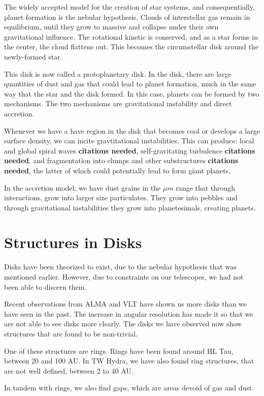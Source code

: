 \documentclass[onecolumn]{report}
\begin{document}
The widely accepted model for the creation of star systems, and consequentially, planet formation is the nebular hypothesis. Clouds of interstellar gas remain in equilibrium, until they grow to massive and collapse under their own gravitational influence. The rotational kinetic is conserved, and as a star forms in the center, the cloud flattens out. This becomes the circumstellar disk around the newly-formed star.


This disk is now called a protoplanetary disk. In the disk, there are large quantities of dust and gas that could lead to planet formation, much in the same way that the star and the disk formed. In this case, planets can be formed by two mechanisms. The two mechanisms are gravitational instability and direct accretion.

Whenever we have a have region in the disk that becomes cool or develops a large surface density, we can incite gravtitational instabilities. This can produce: local and global spiral waves \textbf{citations needed}, self-gravitating turbulence \textbf{citations needed}, and fragmentation into clumps and other substructures \textbf{citations needed}, the latter of which could potentially lead to form giant planets.

In the accretion model, we have dust grains in the $\mu m$ range that through interactions, grow into larger size particulates. They grow into pebbles and through gravitational instabilities they grow into planetesimals, creating planets.

\section{Structures in Disks} %

Disks have been theorized to exist, due to the nebular hypothesis that was mentioned earlier. However, due to constraints on our telescopes, we had not been able to discern them.

Recent observations from ALMA and VLT have shown us more disks than we have seen in the past. The increase in angular resolution has made it so that we are not able to see disks more clearly. The disks we have observed now show structures that are found to be non-trivial.

One of these structures are rings. Rings have been found around HL Tau, between 20 and 100 AU. In TW Hydra, we have also found ring structures, that are not well defined, between 2 to 40 AU.

In tandem with rings, we also find gaps, which are areas devoid of gas and dust.
\end{document}
